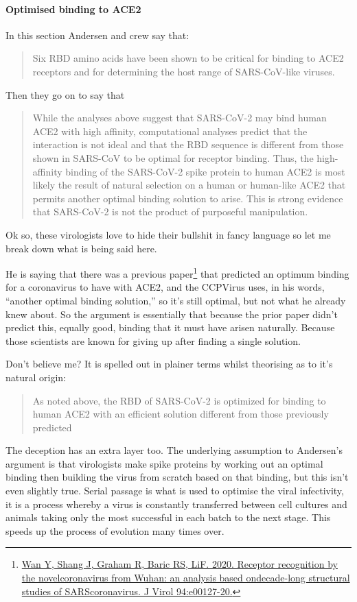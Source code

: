 \documentclass[11pt]{article}
\begin{document}
\paragraph{Optimised binding to ACE2}
\label{sec:org8751887}
In this section Andersen and crew say that:
\begin{quote}
Six RBD amino acids have been shown to be critical for binding to ACE2 receptors and for determining the host range of SARS-CoV-like viruses.
\end{quote}
Then they go on to say that
\begin{quote}
While the analyses above suggest that SARS-CoV-2 may bind human ACE2 with high affinity, computational analyses predict that the interaction is not ideal and that the RBD sequence is different from those shown in SARS-CoV to be optimal for receptor binding. Thus, the high-affinity binding of the SARS-CoV-2 spike protein to human ACE2 is most likely the result of natural selection on a human or human-like ACE2 that permits another optimal binding solution to arise. This is strong evidence that SARS-CoV-2 is not the product of purposeful manipulation.
\end{quote}
Ok so, these virologists love to hide their bullshit in fancy language so let me break down what is being said here.

He is saying that there was a previous paper\footnote{\href{https://doi.org/10.1128/JVI.00127-20}{Wan Y, Shang J, Graham R, Baric RS, LiF. 2020. Receptor recognition by the novelcoronavirus from Wuhan: an analysis based ondecade-long structural studies of SARScoronavirus. J Virol 94:e00127-20.}} that predicted an optimum binding for a coronavirus to have with ACE2, and the CCPVirus uses, in his words, ``another optimal binding solution,'' so it's still optimal, but not what he already knew about. So the argument is essentially that because the prior paper didn't predict this, equally good, binding that it must have arisen naturally. Because those scientists are known for giving up after finding a single solution.

Don't believe me? It is spelled out in plainer terms whilst theorising as to it's natural origin:
\begin{quote}
As noted above, the RBD of SARS-CoV-2 is optimized for binding to human ACE2 with an efficient solution different from those previously predicted
\end{quote}

The deception has an extra layer too. The underlying assumption to Andersen's argument is that virologists make spike proteins by working out an optimal binding then building the virus from scratch based on that binding, but this isn't even slightly true. Serial passage is what is used to optimise the viral infectivity, it is a process whereby a virus is constantly transferred between cell cultures and animals taking only the most successful in each batch to the next stage. This speeds up the process of evolution many times over.
\end{document}
